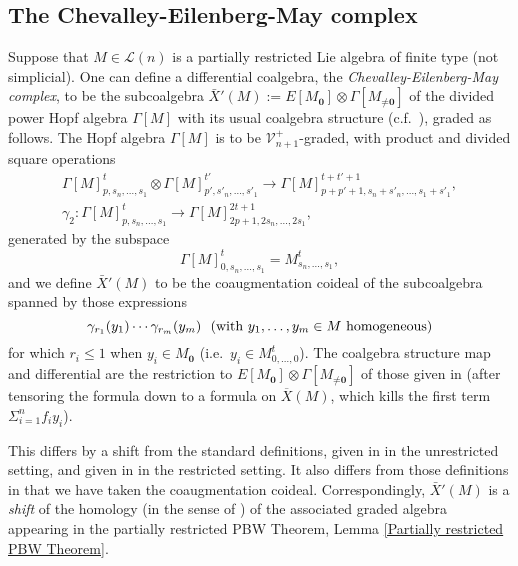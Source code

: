 \documentclass[11pt]{amsart} \renewcommand{\baselinestretch}{1.4}
\theoremstyle{plain}
\theoremstyle{definition}
\renewcommand{\to}{\longrightarrow}
\newcommand{\calL}{\mathcal{L}}
\newcommand{\calV}{\mathcal{V}}
\newcommand{\citeBOX}[2][]{\cite[\mbox{#1}]{#2}}
\newcommand{\vect}[2]{\calV^{#1}_{#2}}
\newcommand{\UEAX}{\bar{X}'}%
\begin{document}
\begin{appendices}
\subsection{The Chevalley-Eilenberg-May complex}
\label{The Chevalley-Eilenberg-May complex}
Suppose that $M\in\calL(n)$ is a partially restricted Lie algebra of finite type (not simplicial). One can define a differential coalgebra, the \emph{Chevalley-Eilenberg-May complex}, to be the subcoalgebra $\UEAX(M):= E[M_{\textbf{0}}]\otimes \Gamma[M_{\neq\textbf{0}}]$ of the divided power Hopf algebra $\Gamma[M]$ with its usual coalgebra structure (c.f.\ \citeBOX[p.~141]{MayRestLie.pdf}), graded as follows. 
The Hopf algebra $\Gamma[M]$ is to be $\vect{+}{n+1}$-graded, with product and divided square operations
\begin{gather*}
\Gamma[M]_{p,s_n,\ldots,s_1}^{t}\otimes \Gamma[M]_{p',s'_n,\ldots,s'_1}^{t'}\to \Gamma[M]_{p+p'+1,s_n+s'_n,\ldots,s_1+s'_1}^{t+t'+1},
\\
\gamma_2:\Gamma[M]_{p,s_n,\ldots,s_1}^{t}\to \Gamma[M]_{2p+1,2s_n,\ldots,2s_1}^{2t+1},
\end{gather*}
generated by the subspace
\[\Gamma[M]_{0,s_n,\ldots,s_1}^{t}=M_{s_n,\ldots,s_1}^{t},\]
and we define $\UEAX(M)$ to be the coaugmentation coideal of the subcoalgebra spanned by those expressions
\[\gamma_{r_1}(y_1)\cdots \gamma_{r_m}(y_m) \textup{\ \ (with $y_1,\ldots,y_m\in M$ homogeneous)}\]
for which  $r_i\leq1$ when $y_i\in M_{\textbf{0}}$ (i.e.\ $y_i\in M_{0,\ldots,0}^t$). The coalgebra structure map and differential are the restriction to $E[M_{\textbf{0}}]\otimes \Gamma[M_{\neq\textbf{0}}]$ of those given in \citeBOX[p.~141]{MayRestLie.pdf} (after tensoring the formula  \citeBOX[(6.19)]{MayRestLie.pdf} down to a formula on $\overline{X}(M)$, which kills the first term $\Sigma_{i=1}^nf_iy_i$).


This differs by a shift from the standard definitions, given in \cite{MR0024908} in the unrestricted setting, and  given in \cite{MayRestLie.pdf} in the  restricted setting. It also differs from those definitions in that we have taken the coaugmentation coideal.  Correspondingly, $\UEAX(M)$  is a \emph{shift} of the homology (in the sense of \cite{PriddyKoszul.pdf}) of the associated graded algebra appearing in the partially restricted PBW Theorem, Lemma \ref{Partially restricted PBW Theorem}. 


\end{appendices}
\end{document}
